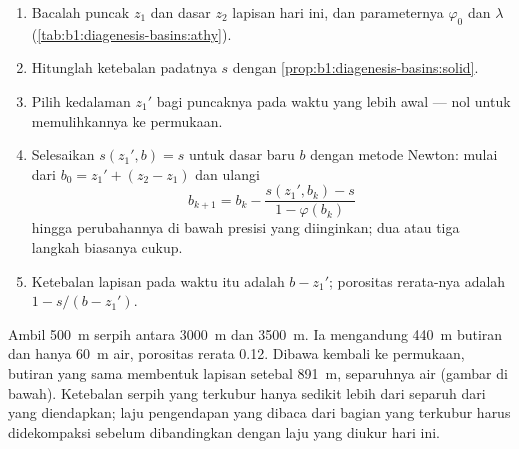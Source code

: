 \begin{method}\label{met:b1:diagenesis-basins:decompaction}
\begin{enumerate}
  \item Bacalah puncak $z_1$ dan dasar $z_2$ lapisan hari ini, dan parameternya $\varphi_0$ dan $\lambda$ (\cref{tab:b1:diagenesis-basins:athy}).
  \item Hitunglah ketebalan padatnya $s$ dengan \cref{prop:b1:diagenesis-basins:solid}.
  \item Pilih kedalaman $z_1'$ bagi puncaknya pada waktu yang lebih awal --- nol untuk memulihkannya ke permukaan.
  \item Selesaikan $s(z_1', b) = s$ untuk dasar baru $b$ dengan metode Newton: mulai dari $b_0 = z_1' + (z_2 - z_1)$ dan ulangi
        \[
          b_{k+1} = b_k - \frac{s(z_1', b_k) - s}{1 - \varphi(b_k)}
        \]
        hingga perubahannya di bawah presisi yang diinginkan; dua atau tiga langkah biasanya cukup.
  \item Ketebalan lapisan pada waktu itu adalah $b - z_1'$; porositas rerata-nya adalah $1 - s/(b - z_1')$.
\end{enumerate}
\end{method}

Ambil \qty{500}{m} serpih antara \qty{3000}{m} dan \qty{3500}{m}. Ia mengandung \qty{440}{m} butiran dan hanya \qty{60}{m} air, porositas rerata \num{0.12}. Dibawa kembali ke permukaan, butiran yang sama membentuk lapisan setebal \qty{891}{m}, separuhnya air (gambar di bawah). Ketebalan serpih yang terkubur hanya sedikit lebih dari separuh dari yang diendapkan; laju pengendapan yang dibaca dari bagian yang terkubur harus didekompaksi sebelum dibandingkan dengan laju yang diukur hari ini.


